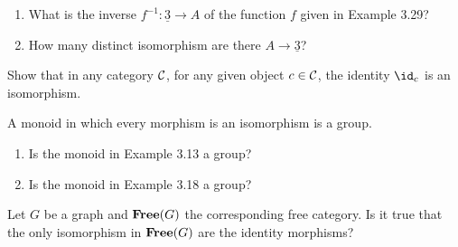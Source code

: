 \begin{enumerate}
	\item What is the inverse $f^{-1}:\underline{3}\to A$ of the function $f$ given in Example 3.29?
	\item How many distinct isomorphism are there $A\to\underline{3}$?
\end{enumerate}

Show that in any category $\mathcal{C}$, for any given object $c\in\mathcal{C}$, the identity $\id_c$ is an isomorphism.

A monoid in which every morphism is an isomorphism is a group.
\begin{enumerate}
	\item Is the monoid in Example 3.13 a group?
	\item Is the monoid in Example 3.18 a group?
\end{enumerate}

Let $G$ be a graph and $\textbf{Free}(G)$ the corresponding free category.  Is it true that the only isomorphism in $\textbf{Free}(G)$ are the identity morphisms?







